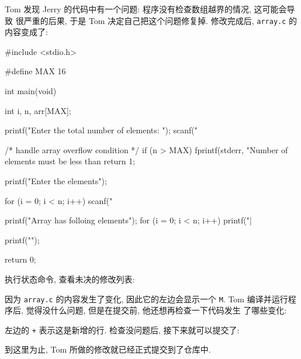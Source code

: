 \documentclass[nofonts, oneside]{ctexbook}
\newcommand\svn{\texttt{svn}}
\newcommand\svnci{\texttt{commit}}
\newcommand\svnst{\texttt{status}}
\newcommand\svndf{\texttt{diff}}
\begin{document}
Tom 发现 Jerry 的代码中有一个问题: 程序没有检查数组越界的情况, 这可能会导致
很严重的后果, 于是 Tom 决定自己把这个问题修复掉. 修改完成后, \texttt{array.c}
的内容变成了:
\begin{ccode}
#include <stdio.h>

#define MAX 16

int main(void)
{
	int i, n, arr[MAX];

	printf("Enter the total number of elements: ");
	scanf("%

	/* handle array overflow condition */
	if (n > MAX) {
		fprintf(stderr, "Number of elements must be less than %
		return 1;
	}

	printf("Enter the elements\n");

	for (i = 0; i < n; i++)
		scanf("%

	printf("Array has folloing elements\n");
	for (i = 0; i < n; i++)
		printf("|%

	printf("\n");

	return 0;
}
\end{ccode}
执行状态命令, 查看未决的修改列表:
因为 \texttt{array.c} 的内容发生了变化, 因此它的左边会显示一个 \texttt{M}.
Tom 编译并运行程序后, 觉得没什么问题, 但是在提交前, 他还想再检查一下代码发生
了哪些变化:
左边的 \texttt{+} 表示这是新增的行. 检查没问题后, 接下来就可以提交了:
到这里为止, Tom 所做的修改就已经正式提交到了仓库中.

\printindex
\end{document}
